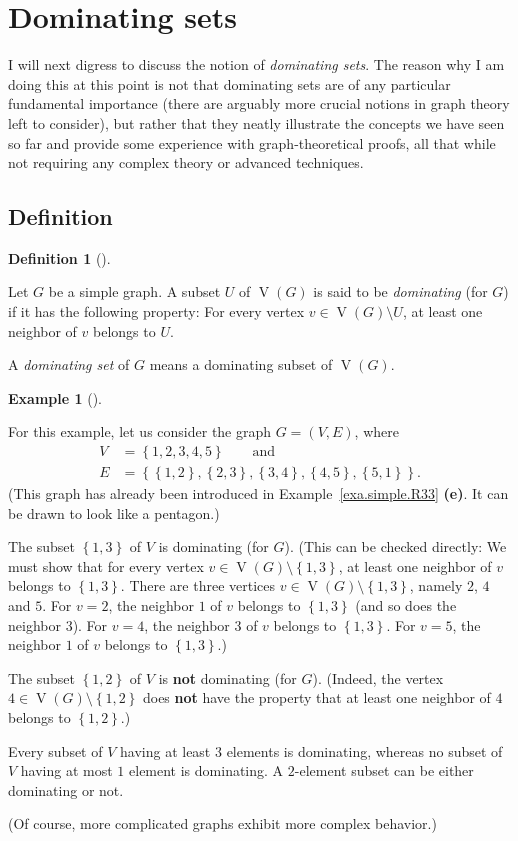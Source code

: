 \documentclass[numbers=enddot,12pt,final,onecolumn,notitlepage]{scrartcl}%
\theoremstyle{definition}
\newtheorem{defi}[theo]{Definition}
\newenvironment{definition}[1][]
{\begin{defi}[#1]\begin{leftbar}}
{\end{leftbar}\end{defi}}
\newtheorem{exam}[theo]{Example}
\newenvironment{example}[1][]
{\begin{exam}[#1]\begin{leftbar}}
{\end{leftbar}\end{exam}}
\newcommand{\set}[1]{\left\{ #1 \right\}}
\newcommand{\tup}[1]{\left( #1 \right)}
\newcommand{\verts}[1]{\operatorname{V}\left( #1 \right)}
\begin{document}
\section{\label{sect.dominating}Dominating sets}

I will next digress to discuss the notion of \textit{dominating sets}.
The reason why I am doing this at this point is not that dominating
sets are of any particular fundamental importance (there are arguably
more crucial notions in graph theory left to consider), but rather
that they neatly illustrate the concepts we have seen so far and
provide some experience with graph-theoretical proofs, all that while
not requiring any complex theory or advanced techniques.

\subsection{\label{subsect.dominating.defs}Definition}

\begin{definition} \label{def.dominating}
Let $G$ be a simple graph. A subset $U$ of $\verts{G}$ is said to be
\textit{dominating} (for $G$) if it has the following property: For
every vertex $v \in \verts{G} \setminus U$, at least one neighbor of
$v$ belongs to $U$.

A \textit{dominating set} of $G$ means a dominating subset of
$\verts{G}$.
\end{definition}

\begin{example} \label{exa.dominating.pentagon}
For this example, let us consider the graph $G = \tup{V, E}$, where
\begin{align*}
V &= \set{1, 2, 3, 4, 5} \qquad \text{and} \\
E &= \set{\set{1,2}, \set{2,3}, \set{3,4}, \set{4,5}, \set{5,1}} .
\end{align*}
(This graph has already been introduced in
Example~\ref{exa.simple.R33} \textbf{(e)}. It can be drawn to look
like a pentagon.)

The subset $\set{1, 3}$ of $V$ is dominating (for $G$). (This can be
checked directly: We must show that
for every vertex $v \in \verts{G} \setminus \set{1, 3}$, at least
one neighbor of $v$ belongs to $\set{1, 3}$. There are three vertices
$v \in \verts{G} \setminus \set{1, 3}$, namely $2$, $4$ and $5$. For
$v = 2$, the neighbor $1$ of $v$ belongs to $\set{1, 3}$ (and so does
the neighbor $3$). For $v = 4$, the neighbor $3$ of $v$ belongs to
$\set{1, 3}$. For $v = 5$, the neighbor $1$ of $v$ belongs to
$\set{1, 3}$.)

The subset $\set{1, 2}$ of $V$ is \textbf{not} dominating (for $G$).
(Indeed, the vertex $4 \in \verts{G} \setminus \set{1, 2}$ does
\textbf{not} have the property that at least one neighbor of $4$
belongs to $\set{1, 2}$.)

Every subset of $V$ having at least $3$ elements is dominating,
whereas no subset of $V$ having at most $1$ element is dominating.
A $2$-element subset can be either dominating or not.

(Of course, more complicated graphs exhibit more complex behavior.)
\end{example}
\end{document}
